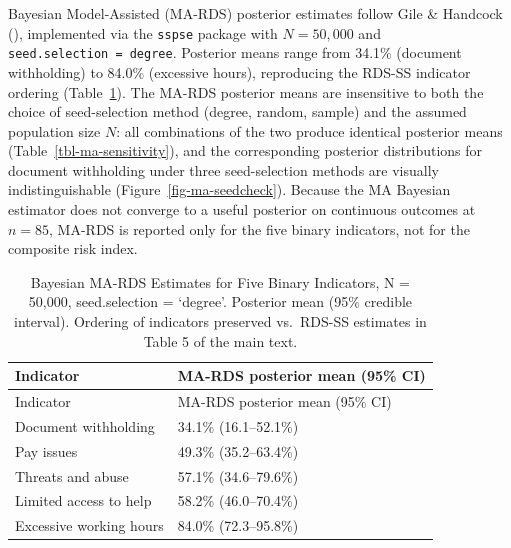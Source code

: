 \documentclass[
  12pt,
  letterpaper,
  DIV=11,
  numbers=noendperiod]{scrreprt}
\begin{document}
Bayesian Model-Assisted (MA-RDS) posterior estimates follow Gile \&
Handcock (), implemented via the
\texttt{sspse} package with \(N = 50{,}000\) and
\texttt{seed.selection\ =\ \textquotesingle{}degree\textquotesingle{}}.
Posterior means range from 34.1\% (document withholding) to 84.0\%
(excessive hours), reproducing the RDS-SS indicator ordering
(Table~\ref{tbl-ma-estimates}). The MA-RDS posterior means are
insensitive to both the choice of seed-selection method (degree, random,
sample) and the assumed population size \(N\): all combinations of the
two produce identical posterior means (Table~\ref{tbl-ma-sensitivity}),
and the corresponding posterior distributions for document withholding
under three seed-selection methods are visually indistinguishable
(Figure~\ref{fig-ma-seedcheck}). Because the MA Bayesian estimator does
not converge to a useful posterior on continuous outcomes at \(n = 85\),
MA-RDS is reported only for the five binary indicators, not for the
composite risk index.

\begin{longtable}[]{@{}ll@{}}
\caption{Bayesian MA-RDS Estimates for Five Binary Indicators, N =
50,000, seed.selection = `degree'. Posterior mean (95\% credible
interval). Ordering of indicators preserved vs.~RDS-SS estimates in
Table 5 of the main text.}\label{tbl-ma-estimates}\tabularnewline
\toprule\noalign{}
Indicator & MA-RDS posterior mean (95\% CI) \\
\midrule\noalign{}
\endfirsthead
\toprule\noalign{}
Indicator & MA-RDS posterior mean (95\% CI) \\
\midrule\noalign{}
\endhead
\bottomrule\noalign{}
\endlastfoot
Document withholding & 34.1\% (16.1--52.1\%) \\
Pay issues & 49.3\% (35.2--63.4\%) \\
Threats and abuse & 57.1\% (34.6--79.6\%) \\
Limited access to help & 58.2\% (46.0--70.4\%) \\
Excessive working hours & 84.0\% (72.3--95.8\%) \\
\end{longtable}
\end{document}
